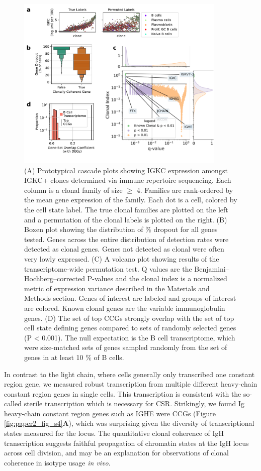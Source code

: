 \begin{figure}[hbt!]
\centering
\includegraphics[width=10cm, keepaspectratio]{figs/InVitro/fig4_bcd.pdf}
\caption[Clonal transcriptional programs are strongly enriched for fate determining genes.]{(A) Prototypical cascade plots showing IGKC expression amongst IGKC+ clones determined via immune repertoire sequencing. Each column is a clonal family of size $\geq$ 4. Families are rank-ordered by the mean gene expression of the family. Each dot is a cell, colored by the cell state label. The true clonal families are plotted on the left and a permutation of the clonal labels is plotted on the right. (B) Boxen plot showing the distribution of \% dropout for all genes tested. Genes across the entire distribution of detection rates were detected as clonal genes. Genes not detected as clonal were often very lowly expressed. (C) A volcano plot showing results of the transcriptome-wide permutation test. Q values are the Benjamini–Hochberg–corrected P-values and the clonal index is a normalized metric of expression variance described in the Materials and Methods section. Genes of interest are labeled and groups of interest are colored. Known clonal genes are the variable immunoglobulin genes. (D) The set of top CCGs strongly overlap with the set of top cell state defining genes compared to sets of randomly selected genes (P < 0.001). The null expectation is the B cell transcriptome, which were size-matched sets of genes sampled randomly from the set of genes in at least 10 \% of B cells.}
\label{fig:paper2_fig_4}
\end{figure}
In contrast to the light chain, where cells generally only transcribed one constant region gene, we measured robust transcription from multiple different heavy-chain constant region genes in single cells. This transcription is consistent with the so-called sterile transcription which is necessary for CSR\cite{lee_quantitative_2001}. Strikingly, we found Ig heavy-chain constant region genes such as IGHE were CCGs (Figure \ref{fig:paper2_fig_s4}\textbf{A}), which was surprising given the diversity of transcriptional states measured for the locus. The quantitative clonal coherence of IgH transcription suggests faithful propagation of chromatin states at the IgH locus across cell division, and may be an explanation for observations of clonal coherence in isotype usage \textit{in vivo}\cite{horns_lineage_2016}.

